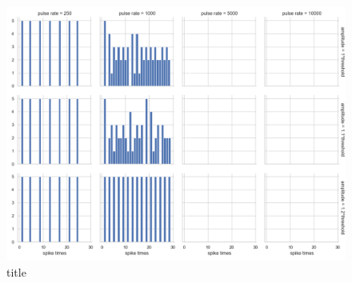 \documentclass[11pt]{article}
\makeatletter
\def\maxwidth{\ifdim\Gin@nat@width>\linewidth\linewidth
    \else\Gin@nat@width\fi}
\let\Oldincludegraphics\includegraphics
\renewcommand{\includegraphics}[1]{\Oldincludegraphics[width=.8\maxwidth]{#1}}
\makeatother
\begin{document}
    \begin{figure}
\centering
\includegraphics{test_battery_results/Rattay et al. 2001/PSTH Rattay et al. 2001.png?arg}
\caption{title}
\end{figure}

    


    
    
    
    
\end{document}

